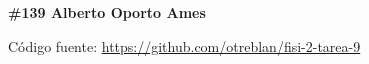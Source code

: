 \documentclass{article}
\begin{document}
\textbf{\#139 Alberto Oporto Ames}
\thispagestyle{fancy}




Código fuente: \url{https://github.com/otreblan/fisi-2-tarea-9}
\end{document}
